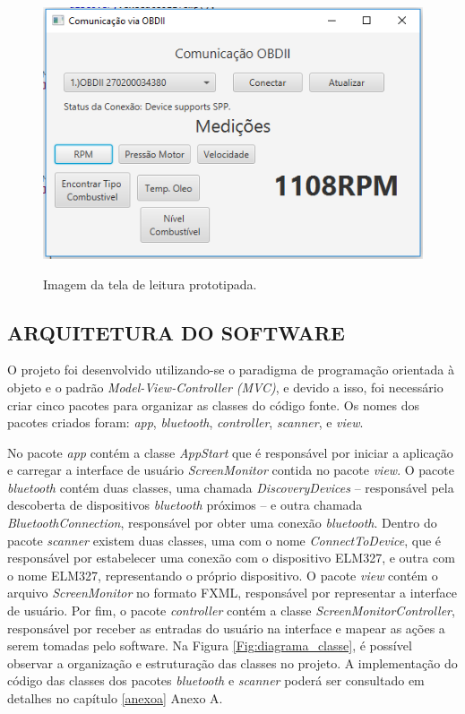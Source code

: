 \begin{figure}[!ht]
\centering
\caption{Imagem da tela de leitura prototipada.} 
{\includegraphics[scale=.75]{imagens/telaLeituraJavaFx.png}}\\
 \label{Fig:tela_leitura_javafx}
\end{figure}

\subsection{ARQUITETURA DO SOFTWARE}
O projeto foi desenvolvido utilizando-se o paradigma de programação orientada à objeto e o padrão \textit{Model-View-Controller (MVC)}, e devido a isso, foi necessário criar cinco pacotes para organizar as classes do código fonte. Os nomes dos pacotes criados foram: \textit{app}, \textit{bluetooth}, \textit{controller}, \textit{scanner}, e \textit{view}.

No pacote \textit{app} contém a classe \textit{AppStart} que é responsável por iniciar a aplicação e carregar a interface de usuário \textit{ScreenMonitor} contida no pacote \textit{view}. O pacote \textit{bluetooth} contém duas classes, uma chamada \textit{DiscoveryDevices} – responsável pela descoberta de dispositivos \textit{bluetooth} próximos – e outra chamada \textit{BluetoothConnection}, responsável por obter uma conexão \textit{bluetooth}. Dentro do pacote \textit{scanner} existem duas classes, uma com o nome \textit{ConnectToDevice}, que é responsável por estabelecer uma conexão com o dispositivo ELM327, e outra com o nome ELM327, representando o próprio dispositivo. O pacote \textit{view} contém o arquivo \textit{ScreenMonitor} no formato FXML, responsável por representar a interface de usuário. Por fim, o pacote \textit{controller} contém a classe \textit{ScreenMonitorController}, responsável por receber as entradas do usuário na interface e mapear as ações a serem tomadas pelo software. Na Figura \ref{Fig:diagrama_classe}, é possível observar a organização e estruturação das classes no projeto. A implementação do código das classes dos pacotes \textit{bluetooth} e \textit{scanner} poderá ser consultado em detalhes no capítulo \ref{anexoa} Anexo A.


